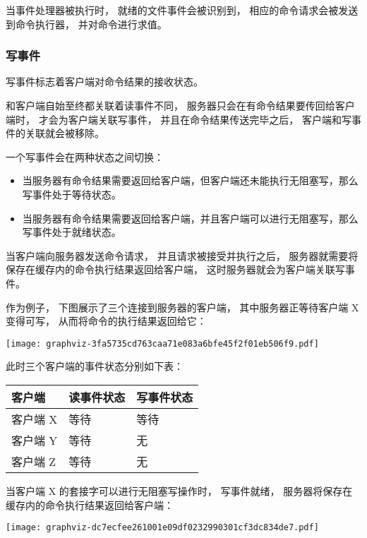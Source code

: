 \documentclass[a4paper,11pt,english]{sphinxmanual}
\begin{document}
当事件处理器被执行时，
就绪的文件事件会被识别到，
相应的命令请求会被发送到命令执行器，
并对命令进行求值。


\subsubsection{写事件}
\label{internal/ae:id4}
写事件标志着客户端对命令结果的接收状态。

和客户端自始至终都关联着读事件不同，
服务器只会在有命令结果要传回给客户端时，
才会为客户端关联写事件，
并且在命令结果传送完毕之后，
客户端和写事件的关联就会被移除。

一个写事件会在两种状态之间切换：
\begin{itemize}
\item {} 
当服务器有命令结果需要返回给客户端，但客户端还未能执行无阻塞写，那么写事件处于等待状态。

\item {} 
当服务器有命令结果需要返回给客户端，并且客户端可以进行无阻塞写，那么写事件处于就绪状态。

\end{itemize}

当客户端向服务器发送命令请求，
并且请求被接受并执行之后，
服务器就需要将保存在缓存内的命令执行结果返回给客户端，
这时服务器就会为客户端关联写事件。

作为例子，
下图展示了三个连接到服务器的客户端，
其中服务器正等待客户端 X 变得可写，
从而将命令的执行结果返回给它：

\texttt{[image: graphviz-3fa5735cd763caa71e083a6bfe45f2f01eb506f9.pdf]}

此时三个客户端的事件状态分别如下表：

\begin{tabulary}{\linewidth}{|L|L|L|}
\hline

客户端
 & 
读事件状态
 & 
写事件状态
\\\hline

客户端 X
 & 
等待
 & 
等待
\\\hline

客户端 Y
 & 
等待
 & 
无
\\\hline

客户端 Z
 & 
等待
 & 
无
\\\hline
\end{tabulary}


当客户端 X 的套接字可以进行无阻塞写操作时，
写事件就绪，
服务器将保存在缓存内的命令执行结果返回给客户端：

\texttt{[image: graphviz-dc7ecfee261001e09df0232990301cf3dc834de7.pdf]}
\end{document}

